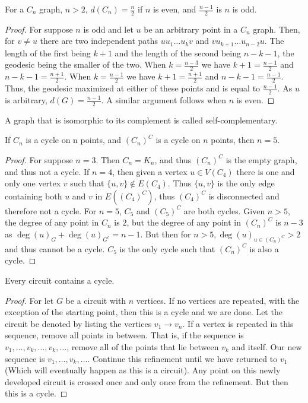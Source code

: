        \begin{theorem}
        For a $C_n$ graph, $n>2$, $d(C_n) = \frac{n}{2}$ if $n$ is even, and $\frac{n-1}{2}$ is $n$ is odd.
        \end{theorem}
        \begin{proof}
        For suppose $n$ is odd and let $u$ be an arbitrary point in a $C_n$ graph. Then, for $v\ne u$ there are two independent paths $uu_1\hdots u_k v$ and $vu_{k+1}\hdots u_{n-2}u$. The length of the first being $k+1$ and the length of the second being $n-k-1$, the geodesic being the smaller of the two. When $k= \frac{n-3}{2}$ we have $k+1 = \frac{n-1}{2}$ and $n-k-1 = \frac{n+1}{2}$. When $k=\frac{n-1}{2}$ we have $k+1 = \frac{n+1}{2}$ and $n-k-1 = \frac{n-1}{2}$. Thus, the geodesic maximized at either of these points and is equal to $\frac{n-1}{2}$. As $u$ is arbitrary, $d(G) = \frac{n-1}{2}$. A similar argument follows when $n$ is even.
        \end{proof}
        \begin{definition}
        A graph that is isomorphic to its complement is called self-complementary.
        \end{definition}
        \begin{theorem}
        If $C_n$ is a cycle on n points, and $(C_n)^C$ is a cycle on $n$ points, then $n = 5$.
        \end{theorem}
        \begin{proof}
        For suppose $n=3$. Then $C_n = K_n$, and thus $(C_n)^C$ is the empty graph, and thus not a cycle. If $n = 4$, then given a vertex $u\in V(C_4)$ there is one and only one vertex $v$ such that $\{u,v\} \notin E(C_4)$. Thus $\{u,v\}$ is the only edge containing both $u$ and $v$ in $E((C_4)^C)$, thus $(C_4)^C$ is disconnected and therefore not a cycle. For $n=5$, $C_5$ and $(C_5)^C$ are both cycles. Given $n>5$, the degree of any point in $C_{n}$ is $2$, but the degree of any point in $(C_n)^C$ is $n-3$ as $\deg(u)_G + \deg(u)_{G^c} = n-1$. But then for $n>5, \deg(u)_{u\in (C_n)^C} > 2$ and thus cannot be a cycle. $C_5$ is the only cycle such that $(C_n)^C$ is also a cycle.
        \end{proof}
        \begin{theorem}
        Every circuit contains a cycle.
        \end{theorem}
        \begin{proof}
        For let $G$ be a circuit with $n$ vertices. If no vertices are repeated, with the exception of the starting point, then this is a cycle and we are done. Let the circuit be denoted by listing the vertices $v_1 \rightarrow v_n$. If a vertex is repeated in this sequence, remove all points in between. That is, if the sequence is $v_1,\hdots, v_k,\hdots, v_k, \hdots$, remove all of the points that lie between $v_k$ and itself. Our new sequence is $v_1, \hdots, v_k, \hdots$. Continue this refinement until we have returned to $v_1$ (Which will eventually happen as this is a circuit). Any point on this newly developed circuit is crossed once and only once from the refinement. But then this is a cycle.
        \end{proof}
